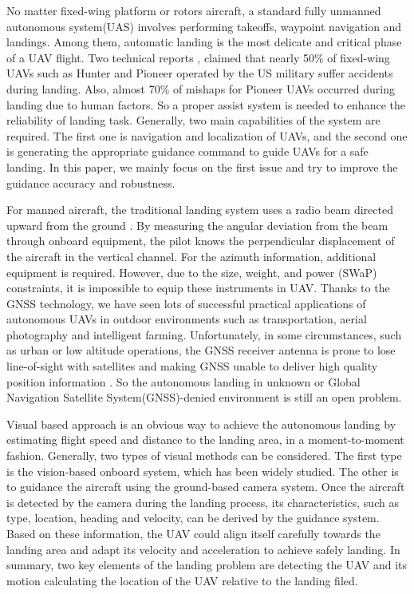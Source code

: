 No matter fixed-wing platform or rotors aircraft, a standard fully unmanned autonomous system(UAS) involves performing takeoffs, waypoint navigation and landings. Among them, automatic landing is the most delicate and critical phase of a UAV flight. Two technical reports \cite{williams2004summary,manning2004role}, claimed that nearly 50\% of fixed-wing UAVs such as Hunter and Pioneer operated by the US military suffer accidents during landing. Also, almost 70\% of mishaps for Pioneer UAVs occurred during landing due to human factors. So a proper assist system is needed to enhance the reliability of landing task. Generally, two main capabilities of the system are required. The first one is navigation and localization of UAVs, and the second one is generating the appropriate guidance command to guide UAVs for a safe landing. In this paper, we mainly focus on the first issue and try to improve the guidance accuracy and robustness.


For manned aircraft, the traditional landing system uses a radio beam directed upward from the ground \cite{mclean1990automatic, stevens2003aircraft}. By measuring the angular deviation from the beam through onboard equipment, the pilot knows the perpendicular displacement of the aircraft in the vertical channel. For the azimuth information, additional equipment is required. However, due to the size, weight, and power (SWaP) constraints, it is impossible to equip these instruments in UAV. Thanks to the GNSS technology, we have seen lots of successful practical applications of autonomous UAVs in outdoor environments such as transportation, aerial photography and intelligent farming. Unfortunately, in some circumstances, such as urban or low altitude operations, the GNSS receiver antenna is prone to lose line-of-sight with satellites and making GNSS unable to deliver high quality position information \cite{farrell1998gps}. So the autonomous landing in unknown or Global Navigation Satellite System(GNSS)-denied environment is still an open problem. 

Visual based approach is an obvious way to achieve the autonomous landing by estimating flight speed and distance to the landing area, in a moment-to-moment fashion. Generally, two types of visual methods can be considered. The first type is the vision-based onboard system, which has been widely studied. The other is to guidance the aircraft using the ground-based camera system. Once the aircraft is detected by the camera during the landing process, its characteristics, such as type, location, heading and velocity, can be derived by the guidance system. Based on these information, the UAV could align itself carefully towards the landing area and adapt its velocity and acceleration to achieve safely landing. In summary, two key elements of the landing problem are detecting the UAV and its motion calculating the location of the UAV relative to the landing filed. 

